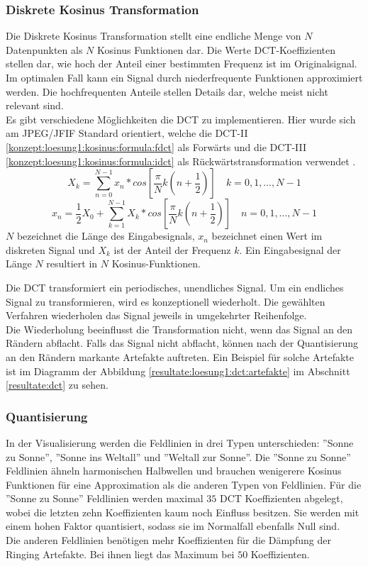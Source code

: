 \subsubsection{Diskrete Kosinus Transformation} \label{konzept:loesung1:kosinus}
Die Diskrete Kosinus Transformation stellt eine endliche Menge von $N$ Datenpunkten als $N$ Kosinus Funktionen dar. Die Werte DCT-Koeffizienten stellen dar, wie hoch der Anteil einer bestimmten Frequenz ist im Originalsignal. Im optimalen Fall kann ein Signal durch niederfrequente Funktionen approximiert werden. Die hochfrequenten Anteile stellen Details dar, welche meist nicht relevant sind.\\
Es gibt verschiedene Möglichkeiten die DCT zu implementieren. Hier wurde sich am JPEG/JFIF Standard orientiert, welche die DCT-II \eqref{konzept:loesung1:kosinus:formula:fdct} als Forwärts und die DCT-III \eqref{konzept:loesung1:kosinus:formula:idct} als Rückwärtstransformation verwendet \cite{wallace1992jpeg}. 
\begin{equation} \label{konzept:loesung1:kosinus:formula:fdct}
	X_k = \sum_{n=0}^{N-1}x_n*cos[\frac{\pi}{N}k(n+\frac{1}{2})] \quad k = 0, 1, \ldots, N-1
\end{equation}
\begin{equation} \label{konzept:loesung1:kosinus:formula:idct}
x_n  = \frac{1}{2}X_0 + \sum_{k=1}^{N-1}X_k*cos[\frac{\pi}{N}k(n+\frac{1}{2})] \quad n = 0,1,\ldots,N-1
\end{equation}
$N$ bezeichnet die Länge des Eingabesignals, $x_n$ bezeichnet einen Wert im diskreten Signal und $X_k$ ist der Anteil der Frequenz $k$. Ein Eingabesignal der Länge $N$ resultiert in $N$ Kosinus-Funktionen.

Die DCT transformiert ein periodisches, unendliches Signal. Um ein endliches Signal zu transformieren, wird es konzeptionell wiederholt. Die gewählten Verfahren wiederholen das Signal jeweils in umgekehrter Reihenfolge.\\
Die Wiederholung beeinflusst die Transformation nicht, wenn das Signal an den Rändern abflacht. Falls das Signal nicht abflacht, können nach der Quantisierung an den Rändern markante Artefakte auftreten. Ein Beispiel für solche Artefakte ist im Diagramm der Abbildung \ref{resultate:loesung1:dct:artefakte} im Abschnitt \ref{resultate:dct} zu sehen.

\subsubsection{Quantisierung}
In der Visualisierung werden die Feldlinien in drei Typen unterschieden: ''Sonne zu Sonne'', ''Sonne ins Weltall'' und ''Weltall zur Sonne''.  Die ''Sonne zu Sonne'' Feldlinien ähneln harmonischen Halbwellen und brauchen wenigerere Kosinus Funktionen für eine Approximation als die anderen Typen von Feldlinien. Für die ''Sonne zu Sonne'' Feldlinien werden maximal $35$ DCT Koeffizienten abgelegt, wobei die letzten zehn Koeffizienten kaum noch Einfluss besitzen. Sie werden mit einem hohen Faktor quantisiert, sodass sie im Normalfall ebenfalls Null sind.\\
Die anderen Feldlinien benötigen mehr Koeffizienten für die Dämpfung der Ringing Artefakte. Bei ihnen liegt das Maximum bei $50$ Koeffizienten.

